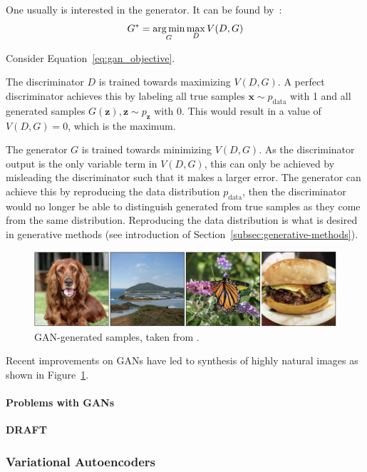 One usually is interested in the generator.
It can be found by~\citep{goodfellow2014gans}:
\begin{align}
    G^* = \operatorname*{arg\,min}_G \max_{D} V(D, G) \label{eq:gan_objective}
\end{align}

Consider Equation~\ref{eq:gan_objective}.

The discriminator $D$ is trained towards maximizing $V(D, G)$.
A perfect discriminator achieves this by labeling all true samples $\bm{x} \sim p_{\text{data}}$ with 1 and all generated samples $G(\bm{z}), \bm{z}\sim p_{\bm{z}}$ with 0.
This would result in a value of $V(D, G) = 0$, which is the maximum.

The generator $G$ is trained towards minimizing $V(D, G)$.
As the discriminator output is the only variable term in $V(D, G)$, this can only be achieved by misleading the discriminator such that it makes a larger error.
The generator can achieve this by reproducing the data distribution $p_{\text{data}}$, then the discriminator would no longer be able to distinguish generated from true samples as they come from the same distribution.
Reproducing the data distribution is what is desired in generative methods (see introduction of Section~\ref{subsec:generative-methods}).

\begin{figure}
    \centering
    \includegraphics[width=\textwidth]{images/gan_samples.png}
    \caption[\ac{GAN}-generated samples]{\ac{GAN}-generated samples, taken from \citet{brock2018large}.}
    \label{fig:gan_samples}
\end{figure}

Recent improvements on \acp{GAN} have led to synthesis of highly natural images as shown in Figure~\ref{fig:gan_samples}.

\paragraph{Problems with \acp{GAN}}
\textbf{DRAFT}

\subsubsection{Variational Autoencoders}\label{subsec:variational-autoencoders}

